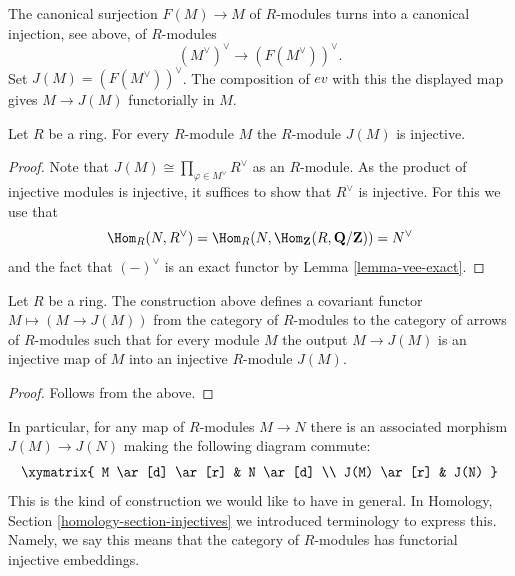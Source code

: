 \noindent
The canonical surjection $F(M) \to M$ of $R$-modules turns into
a canonical injection, see above, of $R$-modules
$$
(M^\vee)^\vee \longrightarrow (F(M^\vee))^\vee.
$$
Set $J(M) = (F(M^\vee))^\vee$. The composition of $ev$ with this
the displayed map gives $M \to J(M)$ functorially in $M$.

\begin{lemma}
\label{lemma-JM-injective}
Let $R$ be a ring. For every $R$-module $M$ the
$R$-module $J(M)$ is injective.
\end{lemma}

\begin{proof}
Note that $J(M) \cong \prod_{\varphi \in M^\vee} R^\vee$ as an $R$-module.
As the product of injective modules is injective, it suffices to
show that $R^\vee$ is injective. For this we use that
$$
\Hom_R(N, R^\vee) =
\Hom_R(N, \Hom_{\mathbf{Z}}(R, \mathbf{Q}/\mathbf{Z})) =
N^\vee
$$
and the
fact that $(-)^\vee$ is an exact functor by Lemma
\ref{lemma-vee-exact}.
\end{proof}

\begin{lemma}
\label{lemma-injectives-modules}
Let $R$ be a ring.
The construction above defines a covariant functor
$M \mapsto (M \to J(M))$ from the category of
$R$-modules to the category of arrows of $R$-modules
such that for every module $M$ the output
$M \to J(M)$ is an injective map of $M$ into
an injective $R$-module $J(M)$.
\end{lemma}

\begin{proof}
Follows from the above.
\end{proof}

\noindent
In particular, for any map of $R$-modules $M \to N$
there is an associated morphism $J(M) \to J(N)$
making the following diagram commute:
$$
\xymatrix{
M \ar[d] \ar[r] & N \ar[d] \\
J(M) \ar[r] & J(N) }
$$
This is the kind of construction we would like to have in general.
In Homology, Section \ref{homology-section-injectives}
we introduced terminology to express this. Namely,
we say this means that the category of $R$-modules
has functorial injective embeddings.











